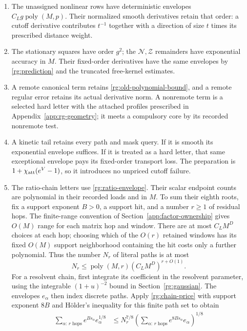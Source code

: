 \begin{enumerate}
\item The unassigned nonlinear rows have deterministic envelopes
$C_Lg\operatorname{poly}(M,p)$. Their normalized smooth derivatives
retain that order: a cutoff derivative contributes $t^{-1}$ together
with a direction of size $t$ times its prescribed distance weight.
\item The stationary squares have order $g^2$; the
$\mathcal N,\mathcal Z$ remainders have exponential accuracy in $M$.
Their fixed-order derivatives have the same envelopes by
\eqref{rg:prediction} and the truncated free-kernel estimates.
\item A remote canonical term retains
\eqref{rg:old-polynomial-bound}, and a remote regular error retains its
actual derivative norm. A nonremote term is a selected hard letter
with the attached profiles prescribed in Appendix~\ref{app:rg-geometry};
it meets a compulsory core by its recorded nonremote test.
\item A kinetic tail retains every path and mask query. If it is
smooth its exponential envelope suffices. If it is treated as a hard
letter, that same exceptional envelope pays its fixed-order transport
loss. The preparation is $1+\chi_{\rm att}(e^V-1)$, so it introduces
no unpriced cutoff failure.
\item The ratio-chain letters use \eqref{rg:ratio-envelope}.
Their scalar endpoint counts are polynomial in their recorded loads and
in $M$. To sum their eighth roots, fix a support exponent $B>0$, a
support hit, and a number $r\ge1$ of residual hops. The finite-range convention of
Section~\ref{app:factor-ownership} gives $O(M)$ range for each
matrix hop and window. There are at most $C_LM^D$ choices at each
hop; choosing which of the $O(r)$ retained windows has its fixed
$O(M)$ support neighborhood containing the hit costs only a further
polynomial. Thus the number $N_r$ of literal
paths is at most
\[
 N_r\le\operatorname{poly}(M,r)(C_LM^D)^{r+O(1)}.
\]
For a resolvent chain, first integrate its coefficient in the resolvent
parameter, using the integrable $(1+u)^{-2}$ bound in
Section~\ref{rg:gaussian}. The envelopes $e_\alpha$ then index discrete
paths. Apply \eqref{rg:chain-price} with support exponent $8B$ and
H\"older's inequality for this finite path set to obtain
\[
 \begin{aligned}
 \sum_{\alpha:\,r\text{ hops}}e^{Bs_\alpha}e_\alpha^{1/8}
 &\le N_r^{7/8}
   \left(\sum_{\alpha:\,r\text{ hops}}
                  e^{8Bs_\alpha}e_\alpha\right)^{1/8}\\

\end{aligned}\]
\end{enumerate}
